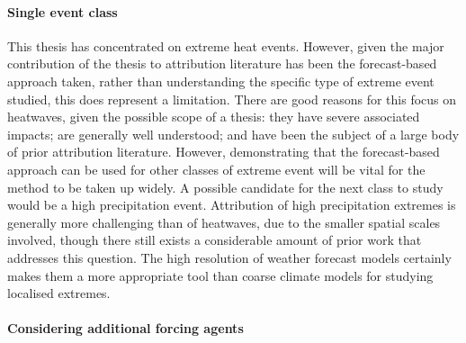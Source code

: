  \paragraph*{Single event class}

    This thesis has concentrated on extreme heat events. However, given the major contribution of the thesis to attribution literature has been the forecast-based approach taken, rather than understanding the specific type of extreme event studied, this does represent a limitation. There are good reasons for this focus on heatwaves, given the possible scope of a thesis: they have severe associated impacts; are generally well understood; and have been the subject of a large body of prior attribution literature. However, demonstrating that the forecast-based approach can be used for other classes of extreme event will be vital for the method to be taken up widely. A possible candidate for the next class to study would be a high precipitation event. Attribution of high precipitation extremes is generally more challenging than of heatwaves, due to the smaller spatial scales involved, though there still exists a considerable amount of prior work that addresses this question. The high resolution of weather forecast models certainly makes them a more appropriate tool than coarse climate models for studying localised extremes.

  \paragraph*{Considering additional forcing agents}

